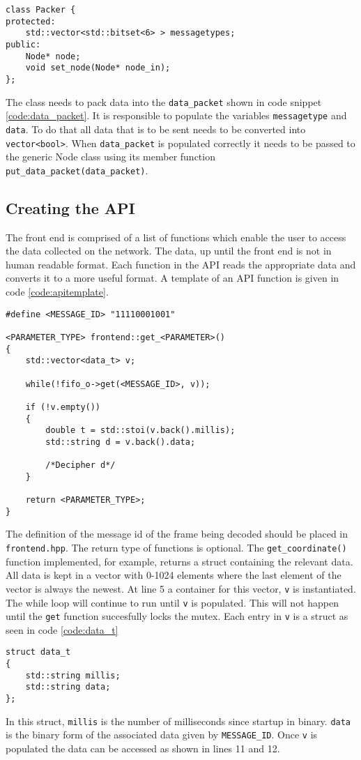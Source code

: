 \begin{lstlisting}[caption=Packer class.,label=code:packer]
class Packer {
protected: 
	std::vector<std::bitset<6> > messagetypes;
public:
	Node* node;
	void set_node(Node* node_in);
};
\end{lstlisting}

The class needs to pack data into the \texttt{data\_packet} shown in code snippet \ref{code:data_packet}.
It is responsible to populate the variables \texttt{messagetype} and \texttt{data}.
To do that all data that is to be sent needs to be converted into \texttt{vector<bool>}.
When \texttt{data\_packet} is populated correctly it needs to be passed to the generic Node class using its member function \texttt{put\_data\_packet(data\_packet)}.

\subsection{Creating the API}
The front end is comprised of a list of functions which enable the user to access the data collected on the network.
The data, up until the front end is not in human readable format.
Each function in the API reads the appropriate data and converts it to a more useful format.
A template of an API function is given in code \ref{code:apitemplate}.

\begin{lstlisting}[caption=Function template for accesing data,label=code:apitemplate]
#define <MESSAGE_ID> "11110001001"

<PARAMETER_TYPE> frontend::get_<PARAMETER>()
{
	std::vector<data_t> v;

	while(!fifo_o->get(<MESSAGE_ID>, v));

	if (!v.empty())
	{
		double t = std::stoi(v.back().millis);
		std::string d = v.back().data;

		/*Decipher d*/		
	}

	return <PARAMETER_TYPE>;
}
\end{lstlisting}

The definition of the message id of the frame being decoded should be placed in \texttt{frontend.hpp}.
The return type of functions is optional.
The \texttt{get\_coordinate()} function implemented, for example, returns a struct containing the relevant data.
All data is kept in a vector with 0-1024 elements where the last element of the vector is always the newest.
At line 5 a container for this vector, \texttt{v} is instantiated.
The while loop will continue to run until \texttt{v} is populated.
This will not happen until the \texttt{get} function succesfully locks the mutex.
Each entry in \texttt{v} is a struct as seen in code \ref{code:data_t}

\begin{lstlisting}[caption=Struct used to store each datapoint,label=code:data_t]
struct data_t
{
	std::string millis;
	std::string data;
};
\end{lstlisting}

In this struct, \texttt{millis} is the number of milliseconds since startup in binary.
\texttt{data} is the binary form of the associated data given by \texttt{MESSAGE\_ID}.
Once \texttt{v} is populated the data can be accessed as shown in lines 11 and 12.